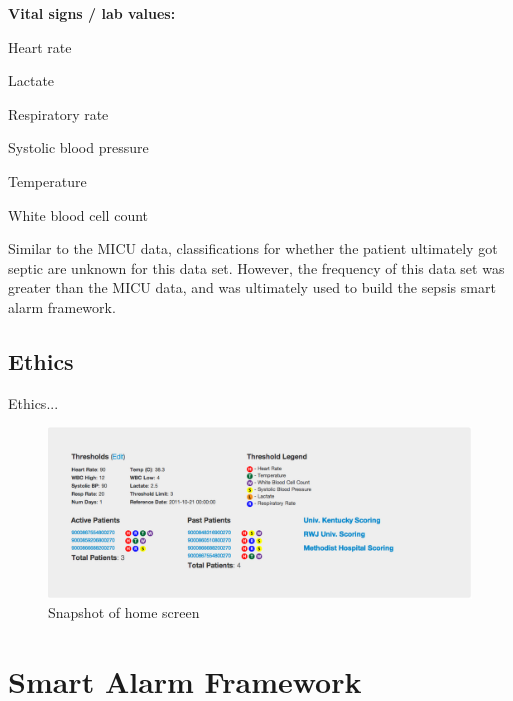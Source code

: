 \documentclass{sig-alternate}
\begin{document}
\noindent \textbf{Vital signs / lab values:}
\begin{itemize*}
  \item Heart rate
  \item Lactate
  \item Respiratory rate
  \item Systolic blood pressure
  \item Temperature
  \item White blood cell count
\end{itemize*}

Similar to the MICU data, classifications for whether the patient ultimately got septic are unknown for this data set.  However, the frequency of this data set was greater than the MICU data, and was ultimately used to build the sepsis smart alarm framework.  

\vspace{10pt}
\subsection{Ethics}
\label{subsec:ethics}
\vspace{10pt}

Ethics...

\begin{figure}
	\begin{center}
		\includegraphics[width=1.0\linewidth]{home.png}
	\end{center}
	\caption{Snapshot of home screen}
	\label{fig:home}
\end{figure}

\vspace{10pt}
\section{Smart Alarm Framework}
\vspace{10pt}
\label{sec:framework}
\end{document}
